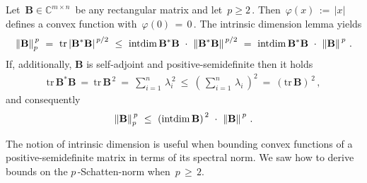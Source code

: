   \begin{example*}
    Let 
    $
    \,
      \mathbf{B} \in \mathbb{C}^{m\times n}
      \,
    $
    be any rectangular matrix and let $\,p\ge 2\,$.
    Then 
    $
    \,
      \varphi(x)
      \,
      :=
      \,
      \left| x \right|
      \,
    $
  defines a convex function with $\,\varphi(0)\,=\,0\,$.
  The intrinsic dimension lemma yields
  \begin{gather*}
    \norm{\mathbf{B}}^{\,p}_p
    \ 
    =
    \ 
    \mathrm{tr}
      \left|
      \mathbf{B}^* \mathbf{B}
      \right|
      ^{\,p/2}
      \ 
    \le
    \ 
    \mathrm{intdim}
    \,
      \mathbf{B}^* \mathbf{B}
      \ 
      \cdot
      \ 
      \norm{
      \mathbf{B}^* \mathbf{B}
    }^{\,p/2}
    \ 
    =
    \ 
    \mathrm{intdim}
    \,
      \mathbf{B}^* \mathbf{B}
      \ 
      \cdot
      \ 
      \norm{
        \mathbf{B}
    }^{\,p}
    \,.
  \end{gather*}
  If, additionally, $\mathbf{B}$ is self-adjoint and positive-semidefinite
  then it holds 
  \begin{gather*}
    \mathrm{tr}
    \,
      \mathbf{B}^* \mathbf{B}
      \ 
    =
    \ 
    \mathrm{tr}
    \,
    \mathbf{B}^{\,2}
    \ 
    =
    \ 
    \sum_{i=1}^{n} 
    \,
    \lambda_i^{\,2}
    \ 
    \le 
    \ 
    \left( 
      \,
    \sum_{i=1}^{n} 
    \,
    \lambda_i
    \,
    \right)
    ^{\!2}
    \ 
    =
    \ 
    \left( 
    \mathrm{tr}
    \,
    \mathbf{B}
    \right)
    ^{\,2}
    \,,
  \end{gather*}
  and consequently
  \begin{gather*}
    \norm{\mathbf{B}}^{\,p}_{p}
    \ 
    \le
    \ 
    \left( 
    \mathrm{intdim}
    \,
    \mathbf{B}
    \right)
    ^{\,2}
    \ 
      \cdot
      \ 
      \norm{
        \mathbf{B}
    }^{\,p}
    \,.
  \end{gather*}
  \end{example*}


\begin{takeaways}
  The notion of intrinsic dimension is useful when bounding convex functions of a positive-semidefinite matrix in terms of its spectral norm.
  We saw how to derive bounds on the $p\,$-Schatten-norm when $\,p\,\ge\, 2$.
\end{takeaways}
